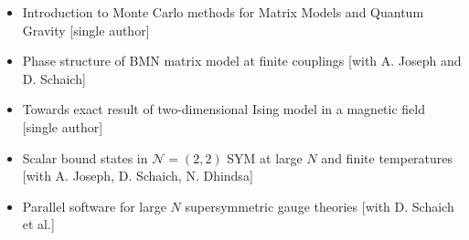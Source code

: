 \renewcommand{\arraystretch}{1.1}

	\begin{itemize}
	\item Introduction to Monte Carlo methods for Matrix Models and Quantum Gravity [single author]  
	 \item Phase structure of BMN matrix model at finite couplings [with A. Joseph and D. Schaich] 
	 \item Towards exact result of two-dimensional Ising model in a magnetic field [single author] 
	 \item Scalar bound states in $\mathcal{N}=(2,2)$ SYM at large $N$ and finite temperatures [with A. Joseph, D. Schaich, N. Dhindsa] 
	 \item Parallel software for large $N$ supersymmetric gauge theories [with D. Schaich et al.] 
	 \end{itemize}
